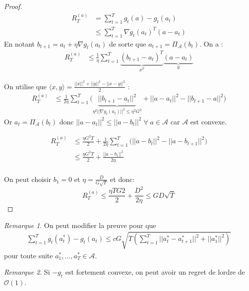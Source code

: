 \documentclass{article}
\theoremstyle{remark}
\theoremstyle{remark}
\newtheorem{remark}{Remarque}[section]
\begin{document}
\begin{proof}
   \begin{align*}
      R_T^{(a)}
      &= \sum_{t=1}^T g_t(a) - g_t(a_t) \\
      &\leq \sum_{t=1}^T \nabla g_t(a_t)^T (a-a_t)
   \end{align*}
   En notant $b_{t+1} = a_t + \eta \nabla g_t(a_t)$ de sorte que $a_{t+1} = \Pi_{\mathcal{A}}(b_t)$. On a :
   \begin{align*}
      R_T^{(a)}
      &\leq \frac 1 \eta \sum_{t=1}^T \underbrace{(b_{t+1} - a_t)^T}_{x^T} \underbrace{(a-a_t)}_{y}
   \end{align*}

   On utilise que $\langle x,y \rangle = \frac{||x||^2 + ||y||^2 - ||x-y||^2}{2}$ :
   \begin{align*}
      R_T^{(a)}
      &\leq \frac{1}{2 \eta} \sum_{t=1}^T \Big( \underbrace{||b_{t+1} - a_t||^2}_{\eta^2 ||\nabla g_t(a_t)||^2 \leq \eta^2 G^2} + ||a-a_t||^2 - ||b_{t+1} - a||^2 \Big)
   \end{align*}
   Or $a_t = \Pi_\mathcal{A}(b_t)$ donc $||a-a_t||^2 \leq ||a-b_t||^2 \; \forall \; a \in \mathcal{A}$ car $\mathcal{A}$ est convexe.

   \begin{align*}
      R_T^{(a)}
      &\leq \frac{\eta G^2 T}{2} + \frac{1}{2 \eta} \sum_{t=1}^T \Big( ||a-b_t||^2 - ||a - b_{t+1}||^2 \Big) \\
      &\leq \frac{\eta G^2 T}{2} + \frac{||a-b_1||^2}{2 \eta} \\
   \end{align*}

   On peut choisir $b_1 = 0$ et $\eta = \frac{D}{G \sqrt{T}}$ et donc:
   $$
   R_T^{(a)} \leq \frac{\eta T G 2}{2} + \frac{D^2}{2 \eta} \leq G D \sqrt{T}
   $$
\end{proof}

\begin{remark}
   On peut modifier la preuve pour que
   \begin{align*}
      \sum_{t=1}^T g_t(a_t^*) - g_t(a_t) \leq c G \sqrt{T \left( \sum_{t=1}^T ||a_t^* - a_{t+1}^* ||^2 + ||a_1^*||^2 \right)}
   \end{align*}
   pour toute suite $a_1^*, ..., a_T^* \in \mathcal{A}$.
\end{remark}

\begin{remark}
   Si $-g_t$ est fortement convexe, on peut avoir un regret de lordre de $\mathcal{O}(1)$.
\end{remark}
\end{document}
